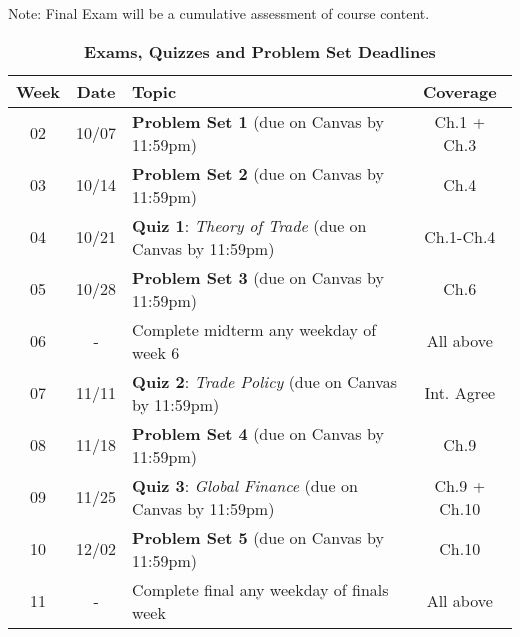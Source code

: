 \documentclass[10pt]{article}
\newcommand{\ra}[1]{\renewcommand{\arraystretch}{#1}}
\begin{document}
Note: Final Exam will be a cumulative assessment of course content. 

\newpage

\begin{table}[h!]
	\caption*{\large\textbf{Exams, Quizzes and Problem Set Deadlines}}
	\centering
	\ra{1.5}
	\begin{tabular}{@{\extracolsep{0.5cm}} c c l c @{}}
		\toprule
		\textbf{Week} & \textbf{Date} & \textbf{Topic} & \textbf{Coverage}  \\ \toprule 
		02 & 10/07 & \textbf{Problem Set 1} (due on Canvas by 11:59pm) & Ch.1 + Ch.3  \\
		03 & 10/14 & \textbf{Problem Set 2} (due on Canvas by 11:59pm) & Ch.4  \\ 
		04 & 10/21 & \textbf{Quiz 1}: \textit{Theory of Trade} (due on Canvas by 11:59pm) & Ch.1-Ch.4 \\
		05 & 10/28 & \textbf{Problem Set 3} (due on Canvas by 11:59pm) & Ch.6 \\ 
		06 & - & Complete midterm any weekday of week 6 & All above\\
		07 & 11/11 & \textbf{Quiz 2}: \textit{Trade Policy} (due on Canvas by 11:59pm) & Int. Agree \\ 
		08 & 11/18 & \textbf{Problem Set 4} (due on Canvas by 11:59pm) &  Ch.9 \\
		09 & 11/25 & \textbf{Quiz 3}: \textit{Global Finance} (due on Canvas by 11:59pm)&  Ch.9 + Ch.10 \\ 
		10 & 12/02 & \textbf{Problem Set 5} (due on Canvas by 11:59pm)& Ch.10 \\
		11 & - & Complete final any weekday of finals week & All above \\  \bottomrule
	\end{tabular}
\end{table}
\end{document}
